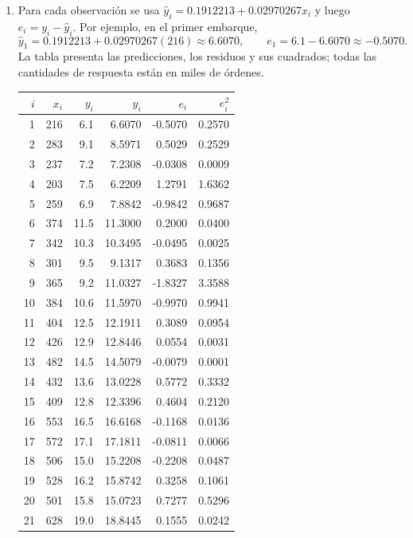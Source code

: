 \begin{enumerate}
    \item[\textbf{f)}] Para cada observación se usa $\widehat y_i=0.1912213+0.02970267x_i$ y luego $e_i=y_i-\widehat y_i$. Por ejemplo, en el primer embarque,
    \[
    \widehat y_1=0.1912213+0.02970267(216)\approx6.6070,\qquad
    e_1=6.1-6.6070\approx-0.5070.
    \]
    La tabla presenta las predicciones, los residuos y sus cuadrados; todas las cantidades de respuesta están en miles de órdenes.
    \begin{table}[H]
    \centering
    \small
    \setlength{\tabcolsep}{5pt}
    \renewcommand{\arraystretch}{1.04}
    \begin{tabular}{r r r r r r}
    \hline
    $i$ & $x_i$ & $y_i$ & $\widehat y_i$ & $e_i$ & $e_i^2$ \\
    \hline
    1 & 216 & 6.1 & 6.6070 & -0.5070 & 0.2570 \\
2 & 283 & 9.1 & 8.5971 & 0.5029 & 0.2529 \\
3 & 237 & 7.2 & 7.2308 & -0.0308 & 0.0009 \\
4 & 203 & 7.5 & 6.2209 & 1.2791 & 1.6362 \\
5 & 259 & 6.9 & 7.8842 & -0.9842 & 0.9687 \\
6 & 374 & 11.5 & 11.3000 & 0.2000 & 0.0400 \\
7 & 342 & 10.3 & 10.3495 & -0.0495 & 0.0025 \\
8 & 301 & 9.5 & 9.1317 & 0.3683 & 0.1356 \\
9 & 365 & 9.2 & 11.0327 & -1.8327 & 3.3588 \\
10 & 384 & 10.6 & 11.5970 & -0.9970 & 0.9941 \\
11 & 404 & 12.5 & 12.1911 & 0.3089 & 0.0954 \\
12 & 426 & 12.9 & 12.8446 & 0.0554 & 0.0031 \\
13 & 482 & 14.5 & 14.5079 & -0.0079 & 0.0001 \\
14 & 432 & 13.6 & 13.0228 & 0.5772 & 0.3332 \\
15 & 409 & 12.8 & 12.3396 & 0.4604 & 0.2120 \\
16 & 553 & 16.5 & 16.6168 & -0.1168 & 0.0136 \\
17 & 572 & 17.1 & 17.1811 & -0.0811 & 0.0066 \\
18 & 506 & 15.0 & 15.2208 & -0.2208 & 0.0487 \\
19 & 528 & 16.2 & 15.8742 & 0.3258 & 0.1061 \\
20 & 501 & 15.8 & 15.0723 & 0.7277 & 0.5296 \\
21 & 628 & 19.0 & 18.8445 & 0.1555 & 0.0242 \\

\end{tabular}
\end{table}
\end{enumerate}
